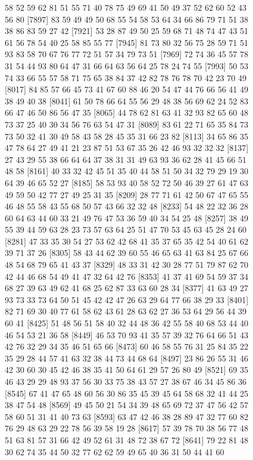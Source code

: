 \documentclass{article}
\begin{document}
\begin{figure}[H]
\begin{Schunk}
\begin{Soutput}
 [7873] 58 52 59 62 81 51 55 71 40 78 75 49 69 41 50 49 37 52 62 60 52 43 56 80
 [7897] 83 59 49 49 50 68 55 54 58 53 64 34 66 86 79 71 51 38 38 86 83 59 27 42
 [7921] 53 28 87 49 50 25 59 68 71 48 74 47 43 51 61 56 78 54 40 25 58 85 55 77
 [7945] 81 73 80 32 56 75 28 59 71 51 93 83 58 70 67 76 77 72 51 57 34 79 73 51
 [7969] 72 74 36 45 57 78 31 54 44 93 80 64 47 31 66 64 63 56 64 25 78 24 74 55
 [7993] 50 53 74 33 66 55 57 58 71 75 65 38 84 37 42 82 78 76 78 70 42 23 70 49
 [8017] 84 85 57 66 45 73 41 67 60 88 46 20 54 47 44 76 66 56 41 49 38 49 40 38
 [8041] 61 50 78 66 64 55 56 29 48 38 56 69 62 24 52 83 66 47 46 50 86 56 47 35
 [8065] 44 78 62 81 63 41 32 93 82 65 60 48 73 37 25 40 30 34 56 76 63 54 47 31
 [8089] 83 61 22 71 65 35 84 73 73 50 32 41 30 49 58 43 58 28 45 35 31 66 23 82
 [8113] 34 65 86 35 47 78 64 27 49 41 21 23 87 51 53 67 35 26 42 46 93 32 32 32
 [8137] 27 43 29 55 38 66 64 64 37 38 31 31 49 63 93 36 62 28 41 45 66 51 48 58
 [8161] 40 33 32 42 45 51 35 40 44 58 51 50 34 32 79 29 19 30 64 39 46 65 52 27
 [8185] 58 53 93 40 58 52 72 50 46 39 27 61 47 63 49 59 50 42 77 27 49 25 31 35
 [8209] 28 77 71 61 42 50 67 47 65 55 46 48 55 58 43 55 68 50 57 43 66 32 32 48
 [8233] 54 48 22 32 36 28 60 64 63 44 60 33 21 49 76 47 53 36 59 40 34 54 25 48
 [8257] 38 49 55 39 44 59 63 28 23 73 57 63 64 25 51 47 70 53 45 63 45 28 24 60
 [8281] 47 33 35 30 54 27 53 62 42 68 41 35 37 65 35 42 54 40 61 62 39 71 37 26
 [8305] 58 43 44 62 39 60 55 46 65 63 41 63 84 25 67 66 48 54 68 79 65 41 43 37
 [8329] 48 33 31 42 30 28 77 51 79 87 62 70 42 44 46 68 54 49 41 47 32 64 42 76
 [8353] 41 37 41 69 54 59 37 34 68 27 39 63 49 62 41 68 25 62 87 33 63 60 28 34
 [8377] 41 63 49 27 93 73 33 73 64 50 51 45 42 42 47 26 63 29 64 77 66 38 29 33
 [8401] 82 71 69 30 40 77 61 58 62 43 61 28 63 62 27 36 53 64 29 56 44 39 60 41
 [8425] 51 48 56 51 58 40 32 44 48 36 42 55 58 40 68 53 44 40 46 54 53 21 36 58
 [8449] 46 53 70 93 41 35 57 39 32 76 64 66 51 43 42 76 32 29 34 35 46 51 65 66
 [8473] 60 46 58 55 76 31 25 84 35 22 35 29 28 44 57 41 63 32 38 44 73 44 68 64
 [8497] 23 86 26 55 31 46 42 30 60 30 45 42 46 38 35 41 50 64 61 29 57 26 80 49
 [8521] 69 35 46 43 29 29 48 93 37 56 30 33 75 38 43 57 27 38 67 46 34 45 86 36
 [8545] 67 41 47 65 48 60 56 30 86 35 45 39 45 64 58 68 32 41 44 25 38 47 54 48
 [8569] 49 45 50 21 54 34 39 48 65 69 72 37 47 56 42 57 58 60 51 31 41 40 73 63
 [8593] 63 47 42 46 38 28 89 47 32 77 60 82 76 29 48 63 29 22 78 56 39 58 19 28
 [8617] 57 39 78 70 38 56 77 48 51 63 81 57 31 66 42 49 52 61 31 48 72 38 67 72
 [8641] 79 22 81 48 30 62 74 35 44 50 32 77 62 62 59 49 65 40 36 31 50 44 41 60

\end{Soutput}
\end{Schunk}
\end{figure}
\end{document}
